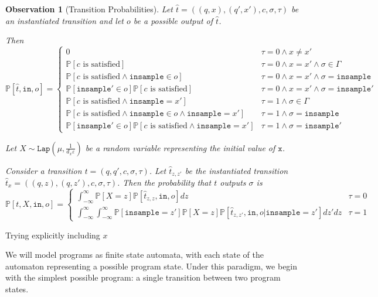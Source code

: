 \documentclass[12pt]{article}
\newcommand{\PP}{\mathbb{P}}
\newcommand{\Lap}{\texttt{Lap}}
\newtheorem{obs}[thm]{Observation}
\theoremstyle{definition}
\begin{document}
\begin{obs}[Transition Probabilities]
    Let $\hat{t} = ((q, x), (q', x'), c, \sigma, \tau)$ be an instantiated transition and let $o$ be a possible output of $\hat{t}$. 

    Then $\PP[\hat{t}, \texttt{in}, o] = \begin{cases}
        0 & \tau=0\land x \neq x'\\
        \PP[c\text{ is satisfied}] & \tau=0\land x=x'\land  \sigma \in \Gamma\\
        \PP[c\text{ is satisfied}\land \texttt{insample}\in o]& \tau=0\land x=x'\land \sigma =\texttt{insample}\\
        \PP[\texttt{insample}'\in o]\PP[c\text{ is satisfied}]& \tau=0\land x=x'\land \sigma =\texttt{insample}'\\
        \PP[c\text{ is satisfied}\land \texttt{insample}=x'] & \tau=1\land \sigma \in \Gamma\\
        \PP[c\text{ is satisfied}\land \texttt{insample}\in o\land \texttt{insample}=x']& \tau=1\land \sigma =\texttt{insample}\\
        \PP[\texttt{insample}'\in o]\PP[c\text{ is satisfied}\land \texttt{insample}=x']& \tau=1\land \sigma =\texttt{insample}'
    \end{cases}$

    Let $X\sim \Lap(\mu, \frac{1}{d_x\varepsilon})$ be a random variable representing the initial value of $\texttt{x}$. 

    Consider a transition $t = (q, q', c, \sigma, \tau)$. Let $\hat{t}_{z, z'}$ be the instantiated transition $\hat{t}_x = ((q, z), (q, z'), c, \sigma, \tau)$.
    Then the probability that $t$ outputs $\sigma$ is \[\PP[t, X, \texttt{in}, o] = \begin{cases}   
        \int_{-\infty}^\infty\PP[X=z]\PP[\hat{t}_{z, z}, \texttt{in}, o]dz & \tau=0\\
        \int_{-\infty}^\infty\int_{-\infty}^\infty\PP[\texttt{insample} = z']\PP[X=z]\PP[\hat{t}_{z, z'}, \texttt{in}, o| \texttt{insample}=z']dz'dz & \tau=1
    \end{cases}\]
\end{obs}


\hrulefill Trying explicitly including $x$


We will model programs as finite state automata, with each state of the automaton representing a possible program state. Under this paradigm, we begin with the simplest possible program: a single transition between two program states. 
\end{document}
